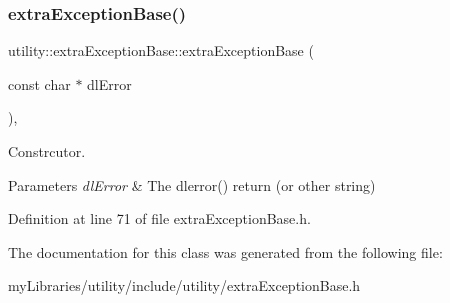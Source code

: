\subsubsection{\texorpdfstring{extraExceptionBase()}{extraExceptionBase()}}
{\footnotesize\ttfamily utility\+::extra\+Exception\+Base\+::extra\+Exception\+Base (\begin{DoxyParamCaption}\item[{const char $\ast$}]{dl\+Error }\end{DoxyParamCaption})\hspace{0.3cm}{\ttfamily [inline]}, {\ttfamily [explicit]}}



Constrcutor. 


\begin{DoxyParams}{Parameters}
{\em dl\+Error} & The dlerror() return (or other string) \\
\hline
\end{DoxyParams}


Definition at line 71 of file extra\+Exception\+Base.\+h.



The documentation for this class was generated from the following file\+:\begin{DoxyCompactItemize}
\item 
my\+Libraries/utility/include/utility/extra\+Exception\+Base.\+h\end{DoxyCompactItemize}
